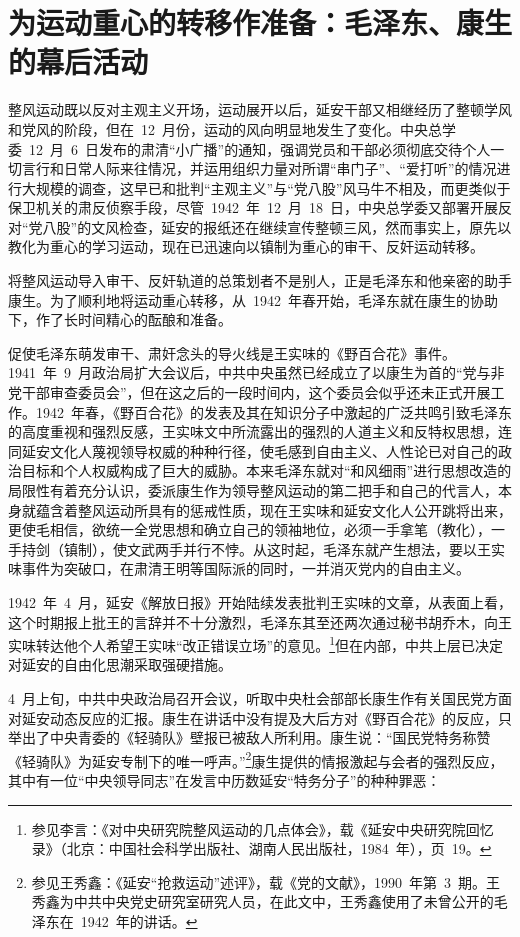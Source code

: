 \section{为运动重心的转移作准备：毛泽东、康生的幕后活动}

整风运动既以反对主观主义开场，运动展开以后，延安干部又相继经历了整顿学风和党风的阶段，但在~12~月份，运动的风向明显地发生了变化。中央总学委~12~月~6~日发布的肃清“小广播”的通知，强调党员和干部必须彻底交待个人一切言行和日常人际来往情况，并运用组织力量对所谓“串门子”、“爱打听”的情况进行大规模的调查，这早已和批判“主观主义”与“党八股”风马牛不相及，而更类似于保卫机关的肃反侦察手段，尽管~1942~年~12~月~18~日，中央总学委又部署开展反对“党八股”的文风检查，延安的报纸还在继续宣传整顿三风，然而事实上，原先以教化为重心的学习运动，现在已迅速向以镇制为重心的审干、反奸运动转移。

将整风运动导入审干、反奸轨道的总策划者不是别人，正是毛泽东和他亲密的助手康生。为了顺利地将运动重心转移，从~1942~年春开始，毛泽东就在康生的协助下，作了长时间精心的酝酿和准备。

促使毛泽东萌发审干、肃奸念头的导火线是王实味的《野百合花》事件。1941~年~9~月政治局扩大会议后，中共中央虽然已经成立了以康生为首的“党与非党干部审查委员会”，但在这之后的一段时间内，这个委员会似乎还未正式开展工作。1942~年春，《野百合花》的发表及其在知识分子中激起的广泛共鸣引致毛泽东的高度重视和强烈反感，王实味文中所流露出的强烈的人道主义和反特权思想，连同延安文化人蔑视领导权威的种种行径，使毛感到自由主义、人性论已对自己的政治目标和个人权威构成了巨大的威胁。本来毛泽东就对“和风细雨”进行思想改造的局限性有着充分认识，委派康生作为领导整风运动的第二把手和自己的代言人，本身就蕴含着整风运动所具有的惩戒性质，现在王实味和延安文化人公开跳将出来，更使毛相信，欲统一全党思想和确立自己的领袖地位，必须一手拿笔（教化），一手持剑（镇制），使文武两手并行不悖。从这时起，毛泽东就产生想法，要以王实味事件为突破口，在肃清王明等国际派的同时，一并消灭党内的自由主义。

1942~年~4~月，延安《解放日报》开始陆续发表批判王实味的文章，从表面上看，这个时期报上批王的言辞并不十分激烈，毛泽东其至还两次通过秘书胡乔木，向王实味转达他个人希望王实味“改正错误立场”的意见。\footnote{参见李言：《对中央研究院整风运动的几点体会》，载《延安中央研究院回忆录》（北京：中国社会科学出版社、湖南人民出版社，1984~年），页~19。}但在内部，中共上层已决定对延安的自由化思潮采取强硬措施。

4~月上旬，中共中央政治局召开会议，听取中央杜会部部长康生作有关国民党方面对延安动态反应的汇报。康生在讲话中没有提及大后方对《野百合花》的反应，只举出了中央青委的《轻骑队》壁报已被敌人所利用。康生说：“国民党特务称赞《轻骑队》为延安专制下的唯一呼声。”\footnote{参见王秀鑫：《延安“抢救运动”述评》，载《党的文献》，1990~年第~3~期。王秀鑫为中共中央党史研究室研究人员，在此文中，王秀鑫使用了未曾公开的毛泽东在~1942~年的讲话。}康生提供的情报激起与会者的强烈反应，其中有一位“中央领导同志”在发言中历数延安“特务分子”的种种罪恶：

